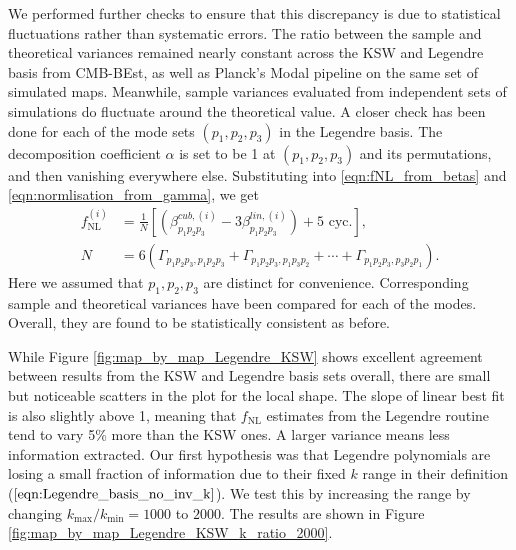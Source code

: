 We performed further checks to ensure that this discrepancy is due to statistical fluctuations rather than systematic errors. The ratio between the sample and theoretical variances remained nearly constant across the KSW and Legendre basis from CMB-BEst, as well as Planck's Modal pipeline on the same set of simulated maps. Meanwhile, sample variances evaluated from independent sets of simulations do fluctuate around the theoretical value. A closer check has been done for each of the mode sets $(p_1,p_2,p_3)$ in the Legendre basis. The decomposition coefficient $\alpha$ is set to be 1 at $(p_1,p_2,p_3)$ and its permutations, and then vanishing everywhere else. Substituting into \eqref{eqn:fNL_from_betas} and \eqref{eqn:normlisation_from_gamma}, we get
\begin{align}
	f_\text{NL}^{(i)} &= \frac{1}{N} \left[ \left( \beta^{cub,(i)}_{p_1 p_2 p_3} - 3 \beta^{lin,(i)}_{p_1 p_2 p_3} \right) + \text{5 cyc.} \right], \\
	N &= 6\left( \Gamma_{p_1 p_2 p_3, p_1 p_2 p_3} + \Gamma_{p_1 p_2 p_3, p_1 p_3 p_2} + \cdots + \Gamma_{p_1 p_2 p_3, p_3 p_2 p_1} \right).
\end{align}
Here we assumed that $p_1,p_2,p_3$ are distinct for convenience. Corresponding sample and theoretical variances have been compared for each of the modes. Overall, they are found to be statistically consistent as before.


While Figure \ref{fig:map_by_map_Legendre_KSW} shows excellent agreement between results from the KSW and Legendre basis sets overall, there are small but noticeable scatters in the plot for the local shape. The slope of linear best fit is also slightly above 1, meaning that $f_\text{NL}$ estimates from the Legendre routine tend to vary 5\% more than the KSW ones. A larger variance means less information extracted. Our first hypothesis was that Legendre polynomials are losing a small fraction of information due to their fixed $k$ range in their definition ($\ref{eqn:Legendre_basis_no_inv_k}$). We test this by increasing the range by changing $k_\text{max}/k_\text{min} = 1000$ to $2000$. The results are shown in Figure \ref{fig:map_by_map_Legendre_KSW_k_ratio_2000}.

